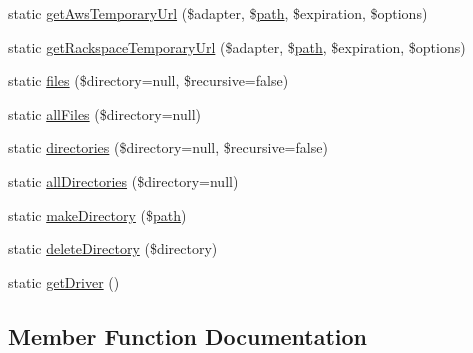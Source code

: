 \begin{DoxyCompactItemize}
\item 
static \mbox{\hyperlink{class_illuminate_1_1_support_1_1_facades_1_1_storage_afab583cc7fed1c7b29745a117afaa76c}{get\+Aws\+Temporary\+Url}} (\$adapter, \$\mbox{\hyperlink{class_illuminate_1_1_support_1_1_facades_1_1_storage_a7aaad06bbb92a00aa33ddbb19cd6a664}{path}}, \$expiration, \$options)
\item 
static \mbox{\hyperlink{class_illuminate_1_1_support_1_1_facades_1_1_storage_a14a9d5a6c873b85f3d2bb35529126921}{get\+Rackspace\+Temporary\+Url}} (\$adapter, \$\mbox{\hyperlink{class_illuminate_1_1_support_1_1_facades_1_1_storage_a7aaad06bbb92a00aa33ddbb19cd6a664}{path}}, \$expiration, \$options)
\item 
static \mbox{\hyperlink{class_illuminate_1_1_support_1_1_facades_1_1_storage_a3af2a63d4acaa6cea523f0ce9588e52d}{files}} (\$directory=null, \$recursive=false)
\item 
static \mbox{\hyperlink{class_illuminate_1_1_support_1_1_facades_1_1_storage_af9426d2b2b4d3c92f9dd4417b93ed54b}{all\+Files}} (\$directory=null)
\item 
static \mbox{\hyperlink{class_illuminate_1_1_support_1_1_facades_1_1_storage_a037ca9b827e4848f213c401321df8332}{directories}} (\$directory=null, \$recursive=false)
\item 
static \mbox{\hyperlink{class_illuminate_1_1_support_1_1_facades_1_1_storage_a450baa0f1a77f252acce87ff0d58a60b}{all\+Directories}} (\$directory=null)
\item 
static \mbox{\hyperlink{class_illuminate_1_1_support_1_1_facades_1_1_storage_a43b2f7423ebb66ed715e6fbd41b5b2d7}{make\+Directory}} (\$\mbox{\hyperlink{class_illuminate_1_1_support_1_1_facades_1_1_storage_a7aaad06bbb92a00aa33ddbb19cd6a664}{path}})
\item 
static \mbox{\hyperlink{class_illuminate_1_1_support_1_1_facades_1_1_storage_aa0da665244d5e57b75aed29d12fb2a09}{delete\+Directory}} (\$directory)
\item 
static \mbox{\hyperlink{class_illuminate_1_1_support_1_1_facades_1_1_storage_a5d2a2ed32f63970c8fe1cc74f08ebd23}{get\+Driver}} ()
\end{DoxyCompactItemize}


\subsection{Member Function Documentation}
\mbox{\label{class_illuminate_1_1_support_1_1_facades_1_1_storage_a450baa0f1a77f252acce87ff0d58a60b}} 
